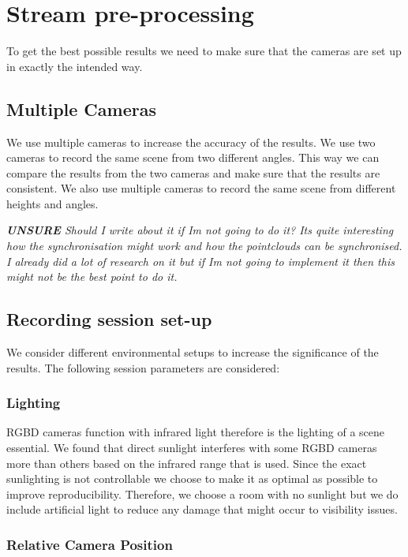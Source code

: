 \section{Stream pre-processing}

To get the best possible results we need to make sure that the cameras are set up in exactly the intended way. 

\subsection{Multiple Cameras}

We use multiple cameras to increase the accuracy of the results. We use two cameras to record the same scene from two different angles. This way we can compare the results from the two cameras and make sure that the results are consistent. We also use multiple cameras to record the same scene from different heights and angles.

\textit{\textbf{UNSURE} Should I write about it if Im not going to do it? Its quite interesting how the synchronisation might work and how the pointclouds can be synchronised. I already did a lot of research on it but if Im not going to implement it then this might not be the best point to do it.}

\subsection{Recording session set-up}

We consider different environmental setups to increase the significance of the results. The following session parameters are considered:

\subsubsection{Lighting}

RGBD cameras function with infrared light therefore is the lighting of a scene essential. We found that direct sunlight interferes with some RGBD cameras more than others based on the infrared range that is used. Since the exact sunlighting is not controllable we choose to make it as optimal as possible to improve reproducibility. Therefore, we choose a room with no sunlight but we do include artificial light to reduce any damage that might occur to visibility issues.

\subsubsection{Relative Camera Position}

